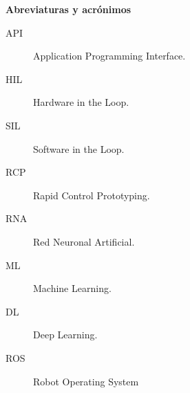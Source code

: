 \textbf{Abreviaturas y acr\'onimos}

\begin{description}
\item[API] Application Programming Interface.
\item[HIL] Hardware in the Loop.
\item[SIL] Software in the Loop.
\item[RCP] Rapid Control Prototyping.
\item[RNA] Red Neuronal Artificial.
\item[ML] Machine Learning.
\item[DL] Deep Learning.     
\item[ROS] Robot Operating System 
\end{description}


